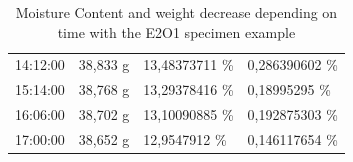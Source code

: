 \begin{table}[]
\begin{tabular}{llll}
		\multicolumn{1}{l}{14:12:00} & \multicolumn{1}{l}{38,833 g} & \multicolumn{1}{l}{13,48373711   \%} & \multicolumn{1}{l}{0,286390602 \%} \\ 
		\multicolumn{1}{l}{15:14:00} & \multicolumn{1}{l}{38,768 g} & \multicolumn{1}{l}{13,29378416   \%} & \multicolumn{1}{l}{0,18995295 \%} \\ 
		\multicolumn{1}{l}{16:06:00} & \multicolumn{1}{l}{38,702 g} & \multicolumn{1}{l}{13,10090885   \%} & \multicolumn{1}{l}{0,192875303 \%} \\ 
		\multicolumn{1}{l}{17:00:00} & \multicolumn{1}{l}{38,652 g} & \multicolumn{1}{l}{12,9547912   \%} & \multicolumn{1}{l}{0,146117654 \%} \\ 
	\end{tabular}
	\caption{Moisture Content and weight decrease depending on time with the E2O1 specimen example}
	\label{tab:MC_decrease}
\end{table}

